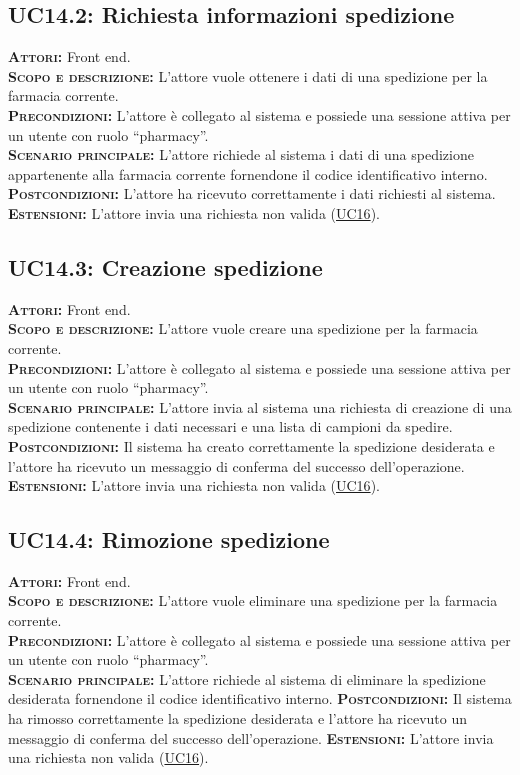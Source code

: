\subsection{UC14.2: Richiesta informazioni spedizione}
\label{sec:UC142}
\textsc{\textbf{Attori:}} Front end.\\
\textsc{\textbf{Scopo e descrizione:}} L'attore vuole ottenere i dati di una spedizione per la farmacia corrente.\\
\textsc{\textsc{\textbf{Precondizioni:}}} L'attore è collegato al sistema e possiede una sessione attiva per un utente con ruolo ``pharmacy''.\\
\textsc{\textbf{Scenario principale:}} L'attore richiede al sistema i dati di una spedizione appartenente alla farmacia corrente fornendone il codice identificativo interno.
\textsc{\textbf{Postcondizioni:}} L'attore ha ricevuto correttamente i dati richiesti al sistema.\\
\textsc{\textbf{Estensioni:}} L'attore invia una richiesta non valida (\hyperref[sec:UC16]{UC16}).

\subsection{UC14.3: Creazione spedizione}
\label{sec:UC143}
\textsc{\textbf{Attori:}} Front end.\\
\textsc{\textbf{Scopo e descrizione:}} L'attore vuole creare una spedizione per la farmacia corrente.\\
\textsc{\textsc{\textbf{Precondizioni:}}} L'attore è collegato al sistema e possiede una sessione attiva per un utente con ruolo ``pharmacy''.\\
\textsc{\textbf{Scenario principale:}} L'attore invia al sistema una richiesta di creazione di una spedizione contenente i dati necessari e una lista di campioni da spedire.
\textsc{\textbf{Postcondizioni:}} Il sistema ha creato correttamente la spedizione desiderata e l'attore ha ricevuto un messaggio di conferma del successo dell'operazione.
\textsc{\textbf{Estensioni:}} L'attore invia una richiesta non valida (\hyperref[sec:UC16]{UC16}).

\subsection{UC14.4: Rimozione spedizione}
\label{sec:UC144}
\textsc{\textbf{Attori:}} Front end.\\
\textsc{\textbf{Scopo e descrizione:}} L'attore vuole eliminare una spedizione per la farmacia corrente.\\
\textsc{\textsc{\textbf{Precondizioni:}}} L'attore è collegato al sistema e possiede una sessione attiva per un utente con ruolo ``pharmacy''.\\
\textsc{\textbf{Scenario principale:}} L'attore richiede al sistema di eliminare la spedizione desiderata fornendone il codice identificativo interno.
\textsc{\textbf{Postcondizioni:}} Il sistema ha rimosso correttamente la spedizione desiderata e l'attore ha ricevuto un messaggio di conferma del successo dell'operazione.
\textsc{\textbf{Estensioni:}} L'attore invia una richiesta non valida (\hyperref[sec:UC16]{UC16}).

